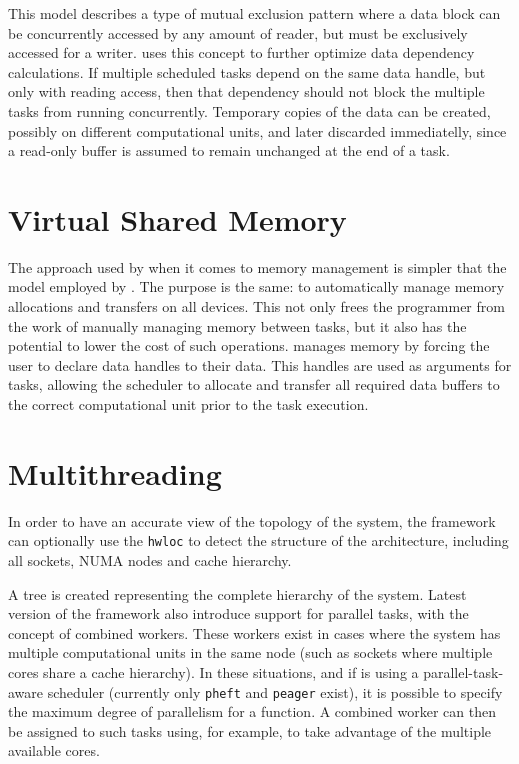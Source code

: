 \documentclass[main.tex]{subfiles}
\begin{document}
This model describes a type of mutual exclusion pattern where a data block can be concurrently accessed by any amount of reader, but must be exclusively accessed for a writer. \starpu uses this concept to further optimize data dependency calculations. If multiple scheduled tasks depend on the same data handle, but only with reading access, then that dependency should not block the multiple tasks from running concurrently. Temporary copies of the data can be created, possibly on different computational units, and later discarded immediatelly, since a read-only buffer is assumed to remain unchanged at the end of a task.



\section{Virtual Shared Memory}

The approach used by \starpu when it comes to memory management is simpler that the model employed by \gama. The purpose is the same: to automatically manage memory allocations and transfers on all devices. This not only frees the programmer from the work of manually managing memory between tasks, but it also has the potential to lower the cost of such operations.
\starpu manages memory by forcing the user to declare data handles to their data. This handles are used as arguments for tasks, allowing the scheduler to allocate and transfer all required data buffers to the correct computational unit prior to the task execution.


\section{Multithreading}

In order to have an accurate view of the topology of the system, the framework can optionally use the \texttt{hwloc} \cite{broquedis2010hwloc} to detect the structure of the architecture, including all \cpu sockets, \acs{NUMA} nodes and cache hierarchy.

A tree is created representing the complete hierarchy of the system. Latest version of the framework also introduce support for parallel tasks, with the concept of combined workers. These workers exist in cases where the system has multiple computational units in the same node (such as \cpu sockets where multiple cores share a cache hierarchy). In these situations, and if \starpu is using a parallel-task-aware scheduler (currently only \texttt{pheft} and \texttt{peager} exist), it is possible to specify the maximum degree of parallelism for a function. A combined worker can then be assigned to such tasks using, for example, \openmp to take advantage of the multiple available cores.
\end{document}
